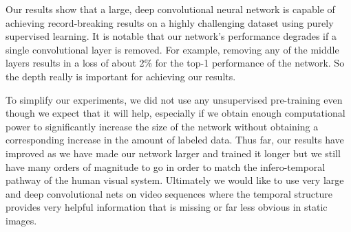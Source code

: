 \documentclass[12pt,a4paper,UTF8,twoside]{book}
\begin{document}
Our results show that a large, deep convolutional neural network is capable of achieving record-breaking results on a highly challenging dataset using purely supervised learning. It is notable that our network's performance degrades if a single convolutional layer is removed. For example, removing any of the middle layers results in a loss of about 2\% for the top-1 performance of the network. So the depth really is important for achieving our results.

To simplify our experiments, we did not use any unsupervised pre-training even though we expect that it will help, especially if we obtain enough computational power to significantly increase the size of the network without obtaining a corresponding increase in the amount of labeled data. Thus far, our results have improved as we have made our network larger and trained it longer but we still have many orders of magnitude to go in order to match the infero-temporal pathway of the human visual system. Ultimately we would like to use very large and deep convolutional nets on video sequences where the temporal structure provides very helpful information that is missing or far less obvious in static images.


\backmatter
\end{document}
